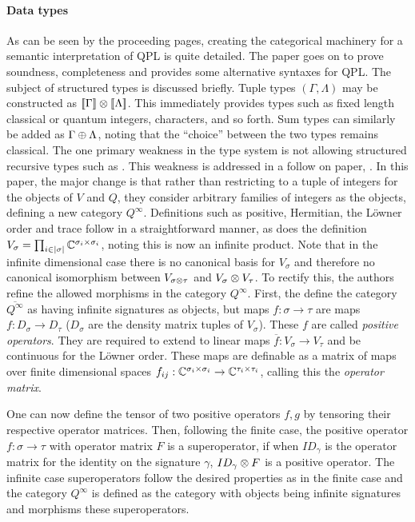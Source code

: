 \paragraph{Data types}
As can be seen by the proceeding pages, creating the categorical machinery for a semantic
interpretation of QPL is quite detailed. The paper \cite{selinger04:qpl} goes on to prove
soundness, completeness and provides some alternative syntaxes for QPL. The subject of structured
types is discussed briefly. Tuple types $(\Gamma,\Lambda)$ may be constructed as
$[\![\Gamma]\!]\otimes[\![\Lambda]\!]$. This immediately provides types such as fixed length classical
or quantum integers, characters, and so forth. Sum types can similarly be added as $\Gamma \oplus
\Lambda$, noting that the ``choice'' between the two types remains classical. The one primary
weakness in the type system is not allowing structured recursive types such as . This
weakness is addressed in a follow on paper, \cite{huet2007}. In this paper, the major change is
that rather than restricting to a tuple of integers for the objects of $V$ and $Q$, they consider
arbitrary families of integers as the objects, defining a new category $Q^{\infty}$. Definitions
such as positive, Hermitian, the L\"owner order and trace follow in a straightforward manner, as
does the definition $V_{\sigma} = \prod_{i\in|\sigma|}\mathbb{C}^{\sigma_{i}\times\sigma_{i}}$, noting this
is now an infinite product. Note that in the infinite dimensional case there is no canonical basis
for $V_{\sigma}$ and therefore no canonical isomorphism between $V_{\sigma\otimes\tau}$ and
$V_{\sigma}\otimes V_{\tau}$. To rectify this, the authors refine the allowed morphisms in the category
$Q^{\infty}$. First, the define the category $\overline{Q^{\infty}}$ as having infinite signatures
as objects, but maps $f:\sigma\to\tau$ are maps $f:D_{\sigma}\to D_{\tau}$ ($D_{\sigma}$ are the
density matrix tuples of $V_{\sigma}$). These $f$ are called \emph{positive operators}. They are
required to extend to linear maps $\overline{f}: V_{\sigma} \to V_{\tau}$ and be continuous for the
L\"owner order. These maps are definable as a matrix of maps over finite dimensional spaces
$f_{ij}:\mathbb{C}^{\sigma_{i}\times\sigma_{i}}\to\mathbb{C}^{\tau_{i}\times\tau_{i}}$, calling this the
\emph{operator matrix}.

One can now define the tensor of two positive operators $f,g$ by tensoring their respective
operator matrices. Then, following the finite case, the positive operator $f:\sigma\to\tau$ with
operator matrix $F$ is a superoperator, if when $ID_{\gamma}$ is the operator matrix for the
identity on the signature $\gamma$, $ID_{\gamma} \otimes F$ is a positive operator. The infinite case
superoperators follow the desired properties as in the finite case and the category $Q^{\infty}$ is
defined as the category with objects being infinite signatures and morphisms these superoperators.

